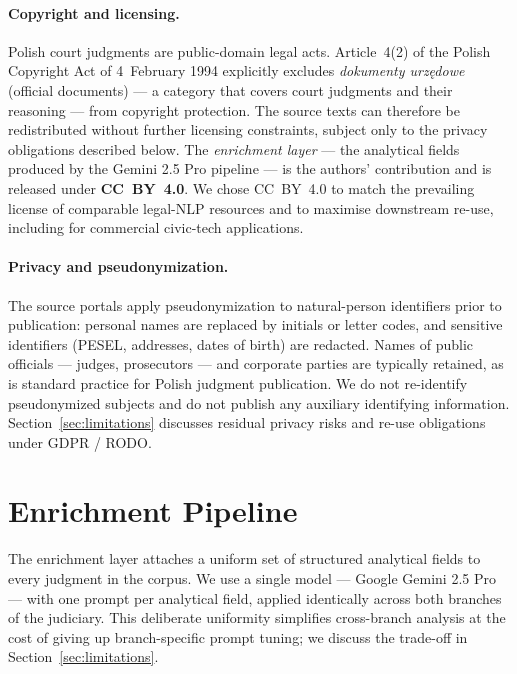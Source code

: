 \documentclass{article}
\begin{document}
\paragraph{Copyright and licensing.} Polish court judgments are public-domain legal acts. Article~4(2) of the Polish Copyright Act of 4~February 1994 explicitly excludes \emph{dokumenty urzędowe} (official documents) --- a category that covers court judgments and their reasoning --- from copyright protection. The source texts can therefore be redistributed without further licensing constraints, subject only to the privacy obligations described below. The \emph{enrichment layer} --- the analytical fields produced by the Gemini 2.5 Pro pipeline --- is the authors' contribution and is released under \textbf{CC~BY~4.0}. We chose CC~BY~4.0 to match the prevailing license of comparable legal-NLP resources \citep{niklaus2024multilegalpile689gbmultilinguallegal,augustyniak2024juddges} and to maximise downstream re-use, including for commercial civic-tech applications.

\paragraph{Privacy and pseudonymization.} The source portals apply pseudonymization to natural-person identifiers prior to publication: personal names are replaced by initials or letter codes, and sensitive identifiers (PESEL, addresses, dates of birth) are redacted. Names of public officials --- judges, prosecutors --- and corporate parties are typically retained, as is standard practice for Polish judgment publication. We do not re-identify pseudonymized subjects and do not publish any auxiliary identifying information. Section~\ref{sec:limitations} discusses residual privacy risks and re-use obligations under GDPR / RODO.

\section{Enrichment Pipeline}
\label{sec:pipeline}

The enrichment layer attaches a uniform set of structured analytical fields to every judgment in the corpus. We use a single model --- Google Gemini 2.5 Pro --- with one prompt per analytical field, applied identically across both branches of the judiciary. This deliberate uniformity simplifies cross-branch analysis at the cost of giving up branch-specific prompt tuning; we discuss the trade-off in Section~\ref{sec:limitations}.
\end{document}
